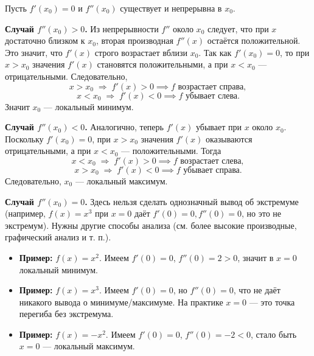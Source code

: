 \begin{customproof}
	Пусть $f'(x_0)=0$ и $f''(x_0)$ существует и непрерывна в $x_0$.

	\textbf{Случай $f''(x_0)>0$.}
	Из непрерывности $f''$ около $x_0$ следует, что при $x$ достаточно близком к $x_0$,
	вторая производная $f''(x)$ остаётся положительной. Это значит, что $f'(x)$ строго возрастает вблизи $x_0$. Так как $f'(x_0)=0$,
	то при $x>x_0$ значения $f'(x)$ становятся положительными,
	а при $x<x_0$ — отрицательными. Следовательно,
	\[
		x>x_0 \;\Longrightarrow\; f'(x)>0 \implies f \text{ возрастает справа},
	\]
	\[
		x<x_0 \;\Longrightarrow\; f'(x)<0 \implies f \text{ убывает слева}.
	\]
	Значит $x_0$ — локальный минимум.

	\textbf{Случай $f''(x_0)<0$.}
	Аналогично, теперь $f'(x)$ убывает при $x$ около $x_0$. Поскольку $f'(x_0)=0$,
	при $x>x_0$ значения $f'(x)$ оказываются отрицательными,
	а при $x<x_0$ — положительными.
	Тогда
	\[
		x<x_0 \;\Longrightarrow\; f'(x)>0 \implies f \text{ возрастает слева},
	\]
	\[
		x>x_0 \;\Longrightarrow\; f'(x)<0 \implies f \text{ убывает справа}.
	\]
	Следовательно, $x_0$ — локальный максимум.

	\textbf{Случай $f''(x_0)=0$.}
	Здесь нельзя сделать однозначный вывод об экстремуме (например, $f(x)=x^3$ при $x=0$ даёт $f'(0)=0, f''(0)=0$, но это не экстремум).
	Нужны другие способы анализа (см. более высокие производные, графический анализ и т. п.).
\end{customproof}

\begin{customexample}
	\begin{itemize}
		\item \textbf{Пример:} $f(x)=x^2$. Имеем $f'(0)=0$, $f''(0)=2>0$, значит
		      в $x=0$ локальный минимум.
		\item \textbf{Пример:} $f(x)=x^3$. Имеем $f'(0)=0$, но $f''(0)=0$,
		      что не даёт никакого вывода о минимуме/максимуме.
		      На практике $x=0$ — это точка перегиба без экстремума.
		\item \textbf{Пример:} $f(x)=-x^2$. Имеем $f'(0)=0$, $f''(0)=-2<0$,
		      стало быть $x=0$ — локальный максимум.
	\end{itemize}
\end{customexample}
